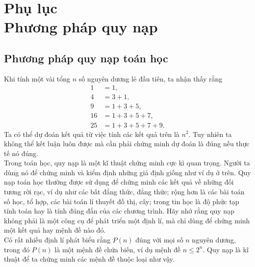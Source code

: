\chapter*{Phụ lục\\
Phương pháp quy nạp
}
\section{Phương pháp quy nạp toán học}
Khi tính một vài tổng $n$ số nguyên dương lẻ đầu tiên, ta nhận thấy rằng 
\begin{align*}
	1&=1,\\
	4&=3+1,\\
	9&=1+3+5,\\
	16&=1+3+5+7,\\
	25&=1+3+5+7+9.
\end{align*}
Ta có thể dự đoán kết quả từ việc tính các kết quả trên là $n^{2}$. Tuy nhiên ta không thể kết luận luôn được mà cần phải chứng minh dự đoán là đúng nếu thực tế nó đúng.\\

Trong toán học, quy nạp là một kĩ thuật chứng minh cực kì quan trọng. Người ta dùng nó để chứng minh và kiểm định những giả định giống như ví dụ ở trên. Quy nạp toán học thường được sử dụng để chứng minh các kết quả về những đối tương rời rạc, ví dụ như các bất đẳng thức, đẳng thức; rộng hơn là các bài toán số học, tổ hợp, các bài toán lí thuyết đồ thị, cây; trong tin học là độ phức tạp tính toán hay là tính đúng đắn của các chương trình. Hãy nhớ rằng quy nạp không phải là một công cụ để phát triển một định lí, mà chỉ dùng để chứng minh một kết quả hay mệnh đề nào đó.\\

Có rất nhiều định lí phát biểu rằng $P(n)$ đúng với mọi số $n$ nguyên dương, trong đó $P(n)$ là một mệnh đề chứa biến, ví dụ mệnh đề $n\le 2^n$. Quy nạp là kĩ thuật để ta chứng minh các mệnh đề thuộc loại như vậy.
